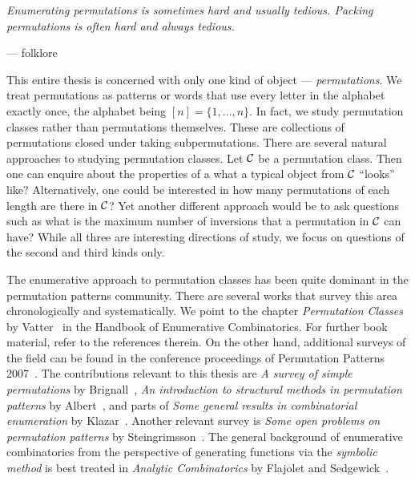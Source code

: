 \documentclass[12pt, a4paper, twoside]{report}
\begin{document}
\begin{center}
\emph{Enumerating permutations is sometimes hard and usually tedious. Packing permutations is often hard and always tedious.}
\end{center}
\begin{flushright}
  \vspace{-15pt}
  --- folklore
  \vspace{20pt}
\end{flushright}



This entire thesis is concerned with only one kind of object --- \emph{permutations}. We treat permutations as patterns or words that use every letter in the alphabet exactly once, the alphabet being $[n] = \{1,\ldots,n\}$. In fact, we study permutation classes rather than permutations themselves. These are collections of permutations closed under taking subpermutations. There are several natural approaches to studying permutation classes. Let $\mathcal{C}$ be a permutation class. Then one can enquire about the properties of a what a typical object from $\mathcal{C}$ ``looks'' like? Alternatively, one could be interested in how many permutations of each length are there in $\mathcal{C}$? Yet another different approach would be to ask questions such as what is the maximum number of inversions that a permutation in $\mathcal{C}$ can have? While all three are interesting directions of study, we focus on questions of the second and third kinds only.

The enumerative approach to permutation classes has been quite dominant in the permutation patterns community. There are several works that survey this area chronologically and systematically. We point to the chapter \emph{Permutation Classes} by Vatter~\cite{vatterhandbook} in the Handbook of Enumerative Combinatorics. For further book material, refer to the references therein. On the other hand, additional surveys of the field can be found in the conference proceedings of Permutation Patterns 2007~\cite{lintonruskucvatter}. The contributions relevant to this thesis are \emph{A survey of simple permutations} by Brignall~\cite{brignallsimple}, \emph{An introduction to structural methods in permutation patterns} by Albert~\cite{albertstructural}, and parts of \emph{Some general results in combinatorial enumeration} by Klazar~\cite{klazargeneral}. Another relevant survey is \emph{Some open problems on permutation patterns} by Steingrimsson~\cite{einar2012openproblems}. The general background of enumerative combinatorics from the perspective of generating functions via the \emph{symbolic method} is best treated in \emph{Analytic Combinatorics} by Flajolet and Sedgewick~\cite{analcomb}.
\end{document}

